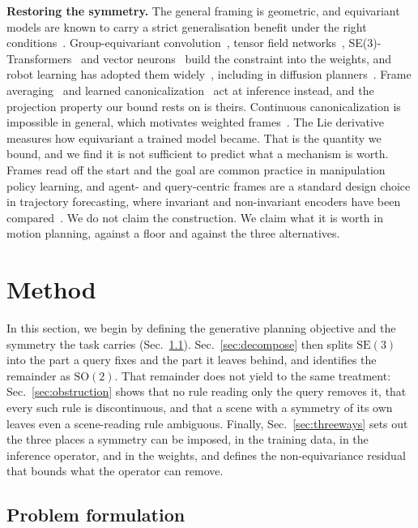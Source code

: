 \documentclass[conference]{IEEEtran}
\newcommand{\SE}{\mathrm{SE}(3)}
\begin{document}
\textbf{Restoring the symmetry.} The general framing is
geometric, and equivariant models are known to carry a
strict generalisation benefit under the right conditions~\cite{elesedy2021strict}.
Group-equivariant
convolution~\cite{cohen2016gcnn}, tensor field networks~\cite{thomas2018tfn},
SE(3)-Transformers~\cite{fuchs2020se3t} and vector neurons~\cite{deng2021vn}
build the constraint into the weights, and robot learning has adopted them
widely~\cite{ryu2023edf,wang2024equidp}, including in diffusion
planners~\cite{brehmer2023edgi}.
Frame averaging~\cite{puny2022fa} and learned
canonicalization~\cite{kaba2023canon} act at inference instead, and the
projection property our bound rests on is theirs. Continuous
canonicalization is impossible in general, which motivates weighted
frames~\cite{dym2024frames}. The Lie
derivative~\cite{gruver2023lie} measures how equivariant a trained model became.
That is the quantity we bound, and we find it is not sufficient to predict what
a mechanism is worth. Frames read off the start and the goal are common practice in manipulation
policy learning, and agent- and query-centric frames are a standard design
choice in trajectory forecasting, where invariant and non-invariant encoders
have been compared~\cite{zhou2022hivt,zhou2023qcnet}. We do not claim the
construction. We claim what it is worth in motion planning, against a floor and
against the three alternatives.

\section{Method}
In this section, we begin by defining the generative planning objective and the symmetry the task
carries (Sec.~\ref{sec:problem}). Sec.~\ref{sec:decompose} then splits $\SE$ into
the part a query fixes and the part it leaves behind, and identifies the
remainder as $\mathrm{SO}(2)$. That remainder does not yield to the same
treatment: Sec.~\ref{sec:obstruction} shows that no rule reading only the query
removes it, that every such rule is discontinuous, and that a scene with a
symmetry of its own leaves even a scene-reading rule ambiguous.
Finally, Sec.~\ref{sec:threeways} sets out the three places a symmetry can be
imposed, in the training data, in the inference operator, and in the weights, and
defines the non-equivariance residual that bounds what the operator can remove.

\subsection{Problem formulation}
\label{sec:problem}
\end{document}
